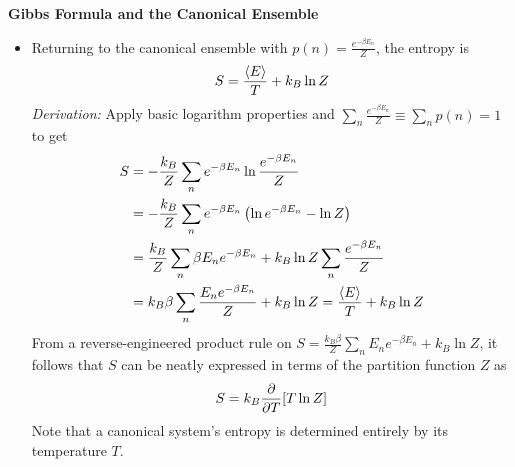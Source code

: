 \documentclass[11pt, a4paper]{article}
\begin{document}
\textbf{Gibbs Formula and the Canonical Ensemble}
\begin{itemize}
	\item Returning to the canonical ensemble with $ p(n) = \frac{e^{-\beta E_{n}}}{Z} $, the entropy is
	\begin{equation*}
		S = \frac{\expval{E}}{T} + k_{B} \ln Z
	\end{equation*}
	\textit{Derivation:} Apply basic logarithm properties and $ \sum_{n} \frac{e^{-\beta E_{n}}}{Z} \equiv \sum_{n} p(n) = 1 $ to get
	\begin{align*}
		S &= - \frac{k_{B}}{Z} \sum_{n}e^{-\beta E_{n}}\ln \frac{e^{-\beta E_{n}}}{Z}\\
		&= - \frac{k_{B}}{Z} \sum_{n}e^{-\beta E_{n}}  \left (\ln e^{-\beta E_{n}} -\ln Z\right )\\
		&= \frac{k_{B}}{Z} \sum_{n} \beta E_{n} e^{-\beta E_{n}} +  k_{B}\ln Z  \sum_{n}  \frac{e^{-\beta E_{n}}}{Z}\\
		&=k_{B}\beta \sum_{n} \frac{E_{n}e^{-\beta E_{n}}}{Z} + k_{B}\ln Z =\frac{\expval{E}}{T} + k_{B} \ln Z
	\end{align*}
	From a reverse-engineered product rule on $ S = \frac{k_{B}\beta}{Z}\sum_{n} E_{n}e^{-\beta E_{n}} + k_{B}\ln Z  $, it follows that $ S $ can be neatly expressed in terms of the partition function $ Z $ as
	\begin{equation*}
		S = k_{B} \pdv{}{T}[T \ln Z]
	\end{equation*}
	Note that a canonical system's entropy is determined entirely by its temperature $ T $.
	
\end{itemize}
\end{document}
